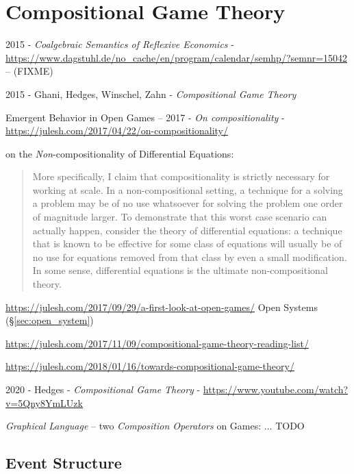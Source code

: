 \section{Compositional Game Theory}\label{sec:compositional_game_theory}

2015 - \emph{Coalgebraic Semantics of Reflexive Economics} -
\url{https://www.dagstuhl.de/no_cache/en/program/calendar/semhp/?semnr=15042} --
(FIXME)

2015 - Ghani, Hedges, Winschel, Zahn - \emph{Compositional Game Theory}

Emergent Behavior in Open Games --
2017 - \emph{On compositionality} -
\url{https://julesh.com/2017/04/22/on-compositionality/}

on the \emph{Non}-compositionality of Differential Equations:
\begin{quote}
  More specifically, I claim that compositionality is strictly necessary
  for working at scale. In a non-compositional setting, a technique for a
  solving a problem may be of no use whatsoever for solving the problem one
  order of magnitude larger. To demonstrate that this worst case scenario can
  actually happen, consider the theory of differential equations: a technique
  that is known to be effective for some class of equations will usually be of
  no use for equations removed from that class by even a small modification. In
  some sense, differential equations is the ultimate non-compositional theory.
\end{quote}

\url{https://julesh.com/2017/09/29/a-first-look-at-open-games/} \fist Open
Systems (\S\ref{sec:open_system})

\url{https://julesh.com/2017/11/09/compositional-game-theory-reading-list/}


\url{https://julesh.com/2018/01/16/towards-compositional-game-theory/}

\asterism

2020 - Hedges - \emph{Compositional Game Theory} -
\url{https://www.youtube.com/watch?v=5Qny8YmLUzk}

\emph{Graphical Language} -- two \emph{Composition Operators} on Games: ... TODO



\subsection{Event Structure}\label{sec:event_structure}

